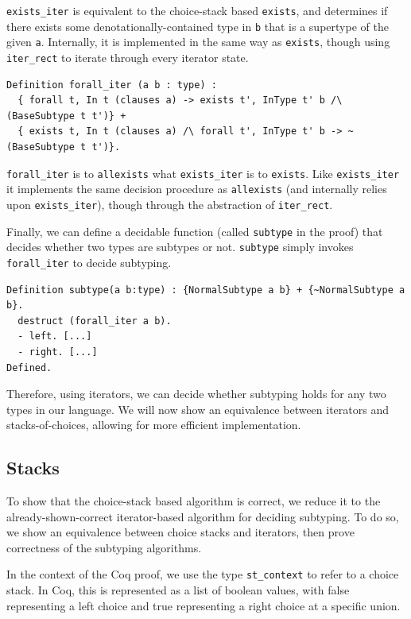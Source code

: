 \documentclass[a4paper,english]{lipics-v2019}
\begin{document}
\verb|exists_iter| is equivalent to the choice-stack based \verb|exists|,
and determines if there exists some denotationally-contained type in \verb|b|
that is a supertype of the given \verb|a|. Internally, it is implemented in 
the same way as \verb|exists|, though using \verb|iter_rect| to iterate 
through every iterator state.

\begin{small}\begin{verbatim}
Definition forall_iter (a b : type) :
  { forall t, In t (clauses a) -> exists t', InType t' b /\ (BaseSubtype t t')} +
  { exists t, In t (clauses a) /\ forall t', InType t' b -> ~ (BaseSubtype t t')}.
\end{verbatim}\end{small}

\verb|forall_iter| is to \verb|allexists| what \verb|exists_iter| is to
\verb|exists|. Like \verb|exists_iter| it implements the same decision procedure
as \verb|allexists| (and internally relies upon \verb|exists_iter|), though through
the abstraction of \verb|iter_rect|.

Finally, we can define a decidable function (called \verb|subtype| in the proof)
that decides whether two types are subtypes or not. \verb|subtype| simply invokes
\verb|forall_iter| to decide subtyping.

\begin{small}\begin{verbatim}
Definition subtype(a b:type) : {NormalSubtype a b} + {~NormalSubtype a b}.
  destruct (forall_iter a b).
  - left. [...]
  - right. [...]
Defined.
\end{verbatim}\end{small}

\noindent Therefore, using iterators, we can decide whether subtyping holds for any two types
in our language. We will now show an equivalence between iterators and stacks-of-choices,
allowing for more efficient implementation.

\subsection{Stacks}

To show that the choice-stack based algorithm is correct, we reduce it to the
already-shown-correct iterator-based algorithm for deciding subtyping. To do so,
we show an equivalence between choice stacks and iterators, then prove correctness
of the subtyping algorithms.

In the context of the Coq proof, we use the type \verb|st_context| to refer
to a choice stack. In Coq, this is represented as a list of boolean values,
with false representing a left choice and true representing a right choice at
a specific union.
\end{document}
